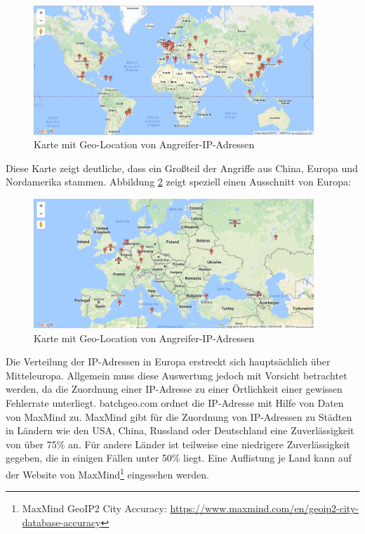\begin{figure}[ht]
	\centering
		\includegraphics[width=0.94\textwidth]{img/geo_ip_world.png}
	\caption{Karte mit Geo-Location von Angreifer-IP-Adressen}
	\label{fig:geo_ip_world}
\end{figure}

Diese Karte zeigt deutliche, dass ein Großteil der Angriffe aus China, Europa und Nordamerika stammen. Abbildung \ref{fig:geo_ip_eu} zeigt speziell einen Ausschnitt von Europa:

\begin{figure}[ht]
	\centering
		\includegraphics[width=0.94\textwidth]{img/geo_ip_eu.png}
	\caption{Karte mit Geo-Location von Angreifer-IP-Adressen}
	\label{fig:geo_ip_eu}
\end{figure}

Die Verteilung der IP-Adressen in Europa erstreckt sich hauptsächlich über Mitteleuropa. Allgemein muss diese Auswertung jedoch mit Vorsicht betrachtet werden, da die Zuordnung einer IP-Adresse zu einer Örtlichkeit einer gewissen Fehlerrate unterliegt. batchgeo.com ordnet die IP-Adresse mit Hilfe von Daten von MaxMind zu. MaxMind gibt für die Zuordnung von IP-Adressen zu Städten in Ländern wie den USA, China, Russland oder Deutschland eine Zuverlässigkeit von über 75\% an. Für andere Länder ist teilweise eine niedrigere Zuverlässigkeit gegeben, die in einigen Fällen unter 50\% liegt. Eine Auflistung je Land kann auf der Website von MaxMind\footnote{ MaxMind GeoIP2 City Accuracy: \url{https://www.maxmind.com/en/geoip2-city-database-accuracy}} eingesehen werden.



